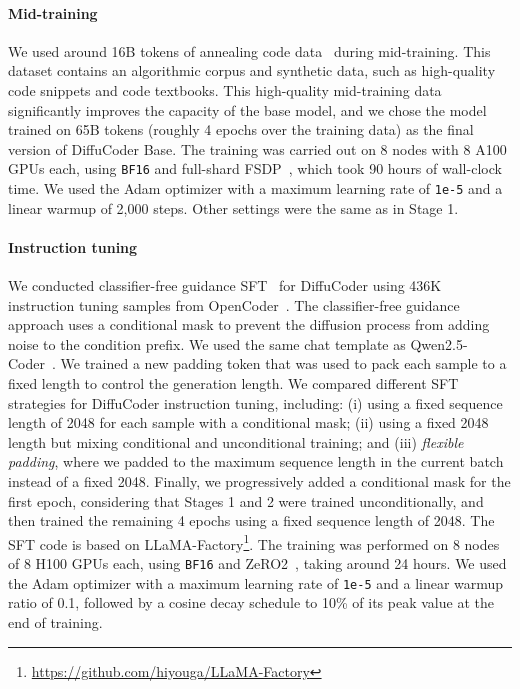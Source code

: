 

\paragraph{Mid-training}
We used around 16B tokens of annealing code data~\citep{huang2024opencoder} during mid-training. This dataset contains an algorithmic corpus and synthetic data, such as high-quality code snippets and code textbooks. 
This high-quality mid-training data significantly improves the capacity of the base model, and we chose the model trained on 65B tokens (roughly 4 epochs over the training data) as the final version of DiffuCoder Base. 
The training was carried out on 8 nodes with 8 A100 GPUs each, using \texttt{BF16} and full-shard FSDP~\citep{zhao2023Fsdp}, which took 90 hours of wall-clock time. We used the Adam optimizer with a maximum learning rate of \texttt{1e-5} and a linear warmup of 2,000 steps. 
Other settings were the same as in Stage 1.
\paragraph{Instruction tuning}
We conducted classifier-free guidance SFT~\citep{gong-etal-2023-diffuseq, nie2024scaling, ye2024diffusion} for DiffuCoder using 436K instruction tuning samples from OpenCoder~\citep{huang2024opencoder}. 
The classifier-free guidance approach uses a conditional mask to prevent the diffusion process from adding noise to the condition prefix. We used the same chat template as Qwen2.5-Coder~\citep{hui2024qwen2}. 
We trained a new padding token that was used to pack each sample to a fixed length to control the generation length. We compared different SFT strategies for DiffuCoder instruction tuning, including: (i) using a fixed sequence length of 2048 for each sample with a conditional mask; (ii) using a fixed 2048 length but mixing conditional and unconditional training; and (iii) \emph{flexible padding}, where we padded to the maximum sequence length in the current batch instead of a fixed 2048. Finally, we progressively added a conditional mask for the first epoch, considering that Stages 1 and 2 were trained unconditionally, and then trained the remaining 4 epochs using a fixed sequence length of 2048. The SFT code is based on LLaMA-Factory\footnote{\url{https://github.com/hiyouga/LLaMA-Factory}}. The training was performed on 8 nodes of 8 H100 GPUs each, using \texttt{BF16} and ZeRO2~\citep{rajbhandari2020zero}, taking around 24 hours. 
We used the Adam optimizer with a maximum learning rate of \texttt{1e-5} and a linear warmup ratio of 0.1, followed by a cosine decay schedule to 10\% of its peak value at the end of training.
